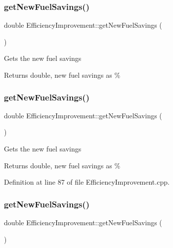 \subsubsection{\texorpdfstring{get\+New\+Fuel\+Savings()}{getNewFuelSavings()}\hspace{0.1cm}{\footnotesize\ttfamily [1/3]}}
{\footnotesize\ttfamily double Efficiency\+Improvement\+::get\+New\+Fuel\+Savings (\begin{DoxyParamCaption}{ }\end{DoxyParamCaption})}

Gets the new fuel savings

\begin{DoxyReturn}{Returns}
double, new fuel savings as \% 
\end{DoxyReturn}
\mbox{\label{class_efficiency_improvement_a1b85007b7b046b998443f5eb267822f9}} 
\subsubsection{\texorpdfstring{get\+New\+Fuel\+Savings()}{getNewFuelSavings()}\hspace{0.1cm}{\footnotesize\ttfamily [2/3]}}
{\footnotesize\ttfamily double Efficiency\+Improvement\+::get\+New\+Fuel\+Savings (\begin{DoxyParamCaption}{ }\end{DoxyParamCaption})}

Gets the new fuel savings

\begin{DoxyReturn}{Returns}
double, new fuel savings as \% 
\end{DoxyReturn}


Definition at line 87 of file Efficiency\+Improvement.\+cpp.

\mbox{\label{class_efficiency_improvement_a1b85007b7b046b998443f5eb267822f9}} 
\subsubsection{\texorpdfstring{get\+New\+Fuel\+Savings()}{getNewFuelSavings()}\hspace{0.1cm}{\footnotesize\ttfamily [3/3]}}
{\footnotesize\ttfamily double Efficiency\+Improvement\+::get\+New\+Fuel\+Savings (\begin{DoxyParamCaption}{ }\end{DoxyParamCaption})}

